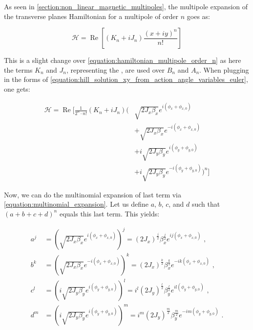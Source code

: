 As seen in \cref{section:non_linear_magnetic_multipoles}, the multipole expansion of the transverse planes Hamiltonian for a multipole of order \(n\) goes as:

\begin{equation}
    \mathcal{H} = \operatorname{Re} \left[ (K_n + i J_n) \frac{(x + i y)^n}{n!} \right]
\end{equation}

This is a slight change over \cref{equation:hamiltonian_multipole_order_n} as here the terms \(K_n\) and \(J_n\), representing the , are used over \(B_n\) and \(A_n\).
When plugging in the forms of \cref{equation:hill_solution_xy_from_action_angle_variables_euler}, one gets:

\begin{equation}
    \begin{aligned}
        \mathcal{H} = \operatorname{Re} \biggl[
            \frac{1}{2^n \cdot n!}  (K_n + iJ_n)
            \biggl(
                & \sqrt{2 J_x \beta_x} e^{i \left( \phi_x + \phi_{x,0} \right)}\\
                & + \sqrt{2 J_x \beta_x} e^{-i \left(\phi_x + \phi_{x,0} \right)}\\
                & + i \sqrt{2 J_y \beta_y} e^{i \left(\phi_y+ \phi_{y,0} \right)} \\
                & + i \sqrt{2 J_y \beta_y} e^{-i \left(\phi_y + \phi_{y,0} \right)} 
            \biggr)^n 
            \biggr]
    \end{aligned}
    \label{equation:hamiltonian_multipole_order_n_xy}
\end{equation}

Now, we can do the multinomial expansion of last term via \cref{equation:multinomial_expansion}.
Let us define \(a\), \(b\), \(c\), and \(d\) such that \(\left( a + b + c + d \right)^n\) equals this last term.
This yields:

\begin{equation}
    \begin{aligned}
        a^j &= \left( \sqrt{2 J_x \beta_x} e^{i \left( \phi_x + \phi_{x,0} \right)} \right)^j = (2 J_x)^{\frac{j}{2}} \beta_x^{\frac{j}{2}} e^{i j \left( \phi_x + \phi_{x,0} \right)} \text{ ,} \\
        b^k &= \left( \sqrt{2 J_x \beta_x} e^{-i \left( \phi_x + \phi_{x,0} \right)} \right)^k = (2 J_x)^{\frac{k}{2}} \beta_x^{\frac{k}{2}} e^{-i k \left( \phi_x + \phi_{x,0} \right)}           \text{ ,} \\
        c^l &= \left( i \sqrt{2 J_y \beta_y} e^{i \left( \phi_y + \phi_{y,0} \right)} \right)^l = i^l  (2 J_y)^{\frac{l}{2}} \beta_y^{\frac{l}{2}} e^{i l \left( \phi_y + \phi_{y,0} \right)}      \text{ ,} \\
        d^m &= \left( i \sqrt{2 J_y \beta_y} e^{i \left( \phi_y + \phi_{y,0} \right)} \right)^m = i^m (2 J_y)^{\frac{m}{2}} \beta_y^{\frac{m}{2}} e^{-i m \left( \phi_y + \phi_{y,0} \right)}      \text{ .} \\
    \end{aligned}
    \label{equation:variables_definition_for_multinomial_expansion}
\end{equation}

